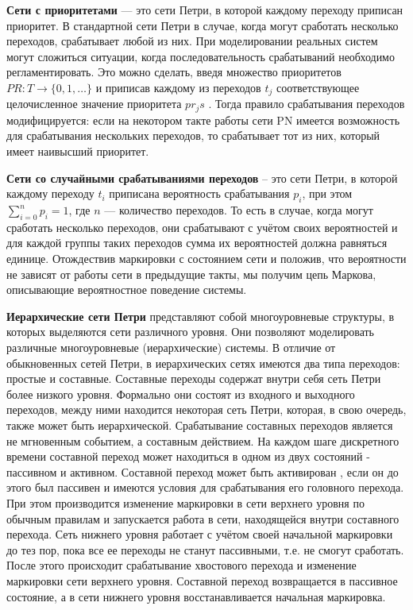 \textbf{Сети с приоритетами} --- это сети Петри, в которой каждому переходу приписан приоритет. В стандартной сети Петри в случае, когда могут сработать несколько переходов, срабатывает любой из них. При моделировании реальных систем могут сложиться ситуации, когда последовательность срабатываний необходимо регламентировать. Это можно сделать, введя множество приоритетов $PR: T \rightarrow\{0,1,\dots\}$ и приписав каждому из переходов $t_j$ соответствующее целочисленное значение приоритета $pr_js$ . Тогда правило срабатывания переходов модифицируется: если на некотором такте работы сети PN имеется возможность для срабатывания нескольких переходов, то срабатывает тот из них, который имеет наивысший приоритет.

\textbf{Сети со случайными срабатываниями переходов} -- это сети Петри, в которой каждому переходу $t_i$ приписана вероятность срабатывания $p_i$, при этом $\sum_{i=0}^{n} p_i = 1$, где $n$ --- количество переходов. То есть в случае, когда могут сработать несколько переходов, они срабатывают с учётом своих вероятностей и для каждой группы таких переходов сумма их вероятностей должна равняться единице. Отождествив маркировки с состоянием сети и положив, что вероятности не зависят от работы сети в предыдущие такты, мы получим цепь Маркова, описывающие вероятностное поведение системы.

\textbf{Иерархические сети Петри} представляют собой многоуровневые структуры, в которых выделяются сети различного уровня. Они позволяют моделировать различные многоуровневые (иерархические) системы. В отличие от обыкновенных сетей Петри, в иерархических сетях имеются два типа переходов: простые и составные. Составные переходы содержат внутри себя сеть Петри более низкого уровня. Формально они состоят из входного и выходного переходов, между ними находится некоторая сеть Петри, которая, в свою очередь, также может быть иерархической. Срабатывание составных переходов является не мгновенным событием, а составным действием. На каждом шаге дискретного времени составной переход может находиться в одном из двух состояний - пассивном и активном. Составной переход может быть активирован , если он до этого был пассивен и имеются условия для срабатывания его головного перехода. При этом производится изменение маркировки в сети верхнего уровня по обычным правилам и запускается работа в сети, находящейся внутри составного перехода. Сеть нижнего уровня работает с учётом своей начальной маркировки до тез пор, пока все ее переходы не станут пассивными, т.е. не смогут сработать. После этого происходит срабатывание хвостового перехода и изменение маркировки сети верхнего уровня. Составной переход возвращается в пассивное состояние, а в сети нижнего уровня восстанавливается начальная маркировка.

